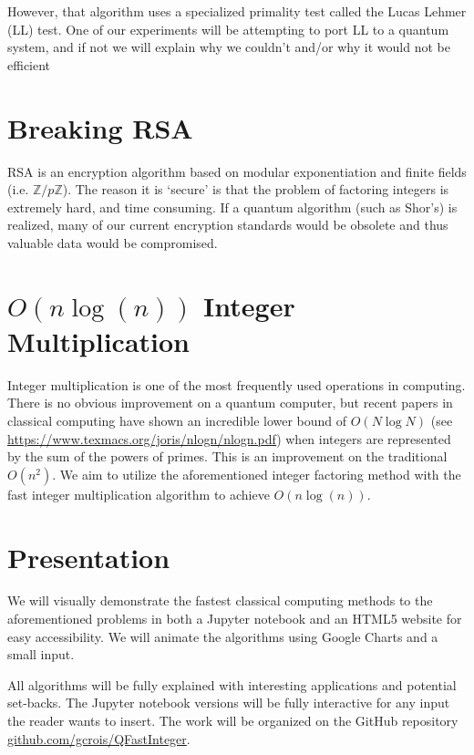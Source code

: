 \documentclass[a4paper,11pt]{article}
\theoremstyle{mytheor}
\begin{document}
However, that algorithm uses a specialized primality test called the Lucas Lehmer (LL) test. One of our experiments will be attempting to port LL to a quantum system, and if not we will explain why we couldn't and/or why it would not be efficient


\section*{Breaking RSA}

RSA is an encryption algorithm based on modular exponentiation and finite fields (i.e. $\mathbb{Z}/p\mathbb{Z}$). The reason it is `secure' is that the problem of factoring integers is extremely hard, and time consuming. If a quantum algorithm (such as Shor's) is realized, many of our current encryption standards would be obsolete and thus valuable data would be compromised.

\section*{$O(n\log(n))$ Integer Multiplication}
Integer multiplication is one of the most frequently used operations in computing. There is no obvious improvement on a quantum computer, but recent papers in classical computing have shown an incredible lower bound of $O(N \log{N})$ (see \href{https://www.texmacs.org/joris/nlogn/nlogn.pdf}{https://www.texmacs.org/joris/nlogn/nlogn.pdf}) when integers are represented by the sum of the powers of primes. This is an improvement on the traditional $O(n^2)$. We aim to utilize the aforementioned integer factoring method with the fast integer multiplication algorithm to achieve $O(n\log(n))$.

\section*{Presentation}
We will visually demonstrate the fastest classical computing methods to the aforementioned problems in both a Jupyter notebook and an HTML5 website for easy accessibility. We will animate the algorithms using Google Charts and a small input.

All algorithms will be fully explained with interesting applications and potential set-backs. The Jupyter notebook versions will be fully interactive for any input the reader wants to insert. The work will be organized on the GitHub repository \href{https://github.com/gcrois/QFastInteger}{github.com/gcrois/QFastInteger}.
\end{document}
